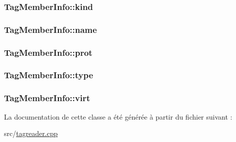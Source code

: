 \subsubsection[{kind}]{ Tag\+Member\+Info\+::kind}\label{class_tag_member_info_aa4c0dd35f21b4e6a8a2fdbb21ae188a2}
\hypertarget{class_tag_member_info_ad81f703d9cbc2be2b1adc482c56cd2bd}{}
\subsubsection[{name}]{ Tag\+Member\+Info\+::name}\label{class_tag_member_info_ad81f703d9cbc2be2b1adc482c56cd2bd}
\hypertarget{class_tag_member_info_ab6705af8092ff3b4cffee19c9d4d7eca}{}
\subsubsection[{prot}]{ Tag\+Member\+Info\+::prot}\label{class_tag_member_info_ab6705af8092ff3b4cffee19c9d4d7eca}
\hypertarget{class_tag_member_info_ae90e145bfaf517d0b47b342d2297c484}{}
\subsubsection[{type}]{ Tag\+Member\+Info\+::type}\label{class_tag_member_info_ae90e145bfaf517d0b47b342d2297c484}
\hypertarget{class_tag_member_info_a73ff13e54210faa3046174b1898ba114}{}
\subsubsection[{virt}]{ Tag\+Member\+Info\+::virt}\label{class_tag_member_info_a73ff13e54210faa3046174b1898ba114}


La documentation de cette classe a été générée à partir du fichier suivant \+:\begin{DoxyCompactItemize}
\item 
src/\hyperlink{tagreader_8cpp}{tagreader.\+cpp}\end{DoxyCompactItemize}
